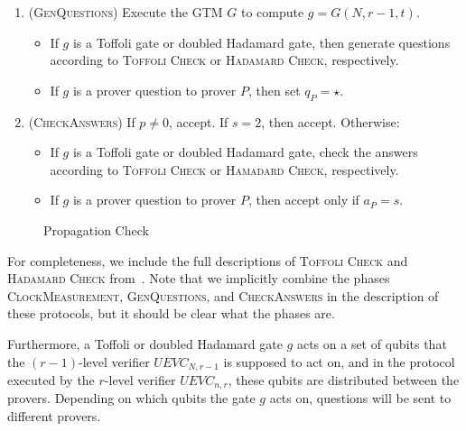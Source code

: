 \begin{center}
\begin{mdframed}
\begin{enumerate}
	\item (\textsc{GenQuestions}) Execute the GTM $G$ to compute $g = G(N,r-1,t)$. 
	\begin{itemize}
		\item If $g$ is a Toffoli gate or doubled Hadamard gate, then generate questions according to \textsc{Toffoli Check} or \textsc{Hadamard Check}, respectively. 
		\item If $g$ is a prover question to prover $P$, then set $q_P = \star$. %
	\end{itemize}
		\item (\textsc{CheckAnswers}) If $p \neq 0$, accept. If $s = 2$, then accept. Otherwise:
		\begin{itemize}
			\item If $g$ is a Toffoli gate or doubled Hadamard gate, check the answers according to \textsc{Toffoli Check} or \textsc{Hamadard Check}, respectively. 
			\item If $g$ is a prover question to prover $P$, then accept only if $a_P = s$. 
		\end{itemize}
	\end{enumerate}    
\end{mdframed}

\end{center}
\begin{figure}[H]
\caption{Propagation Check}
\label{fig:prop_check}
\end{figure}

For completeness, we include the full descriptions of \textsc{Toffoli Check} and \textsc{Hadamard Check} from~\cite{ji2016compression}. Note that we implicitly combine the phases \textsc{ClockMeasurement}, \textsc{GenQuestions}, and \textsc{CheckAnswers} in the description of these protocols, but it should be clear what the phases are.

Furthermore, a Toffoli or doubled Hadamard gate $g$ acts on a set of qubits that the $(r-1)$-level verifier $UEVC_{N,r-1}$ is supposed to act on, and in the protocol executed by the $r$-level verifier $UEVC_{n,r}$, these qubits are distributed between the provers. Depending on which qubits the gate $g$ acts on, questions will be sent to different provers. 

